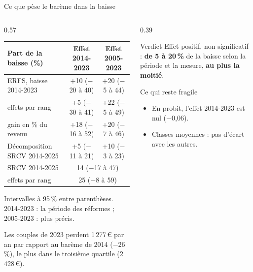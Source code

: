 \documentclass[10pt,aspectratio=169]{beamer}
\begin{document}
\begin{frame}{Ce que pèse le barème dans la baisse}
  \begin{columns}[T]
    \begin{column}{0.57\textwidth}
      \footnotesize\setlength{\tabcolsep}{3pt}
      \begin{tabular}{@{}lcc@{}}
        \toprule
        Part de la baisse (\%) & Effet 2014-2023 & Effet 2005-2023 \\
        \midrule
        ERFS, baisse 2014-2023 & +10 ($-$20 à 40) & +20 ($-$5 à 44) \\
        \quad effets par rang & +5 ($-$30 à 41) & +22 ($-$5 à 49) \\
        \quad gain en \% du revenu & +18 ($-$16 à 52) & +20 ($-$7 à 46) \\
        Décomposition SRCV 2014-2025 & +5 ($-$11 à 21) & +10 ($-$3 à 23) \\
        \midrule
        SRCV 2014-2025 & \multicolumn{2}{c}{14 ($-$17 à 47)} \\
        \quad effets par rang & \multicolumn{2}{c}{25 ($-$8 à 59)} \\
        \bottomrule
      \end{tabular}
      \vspace{0.1cm}

      \scriptsize Intervalles à 95\,\% entre parenthèses. 2014-2023 : la période des réformes ; 2005-2023 : plus précis.
      \vspace{0.2cm}

      \small Les couples de 2023 perdent 1\,277\,€ par an par rapport au barème de 2014 ($-$26\,\%), le plus dans le troisième quartile (2\,428\,€).
    \end{column}
    \begin{column}{0.39\textwidth}
      \begin{callout}[tdtenavy]{Verdict}
        \footnotesize\RaggedRight Effet positif, non significatif : \textbf{de 5 à 20\,\%} de la baisse selon la période et la mesure, \textbf{au plus la moitié}.
      \end{callout}
      \begin{callout}{Ce qui reste fragile}
        \footnotesize\RaggedRight
        \begin{itemize}\setlength{\itemsep}{1pt}
          \item En probit, l'effet 2014-2023 est nul ($-$0,06).
          \item Classes moyennes : pas d'écart avec les autres.
        \end{itemize}
      \end{callout}
    \end{column}
  \end{columns}
\end{frame}
\end{document}
